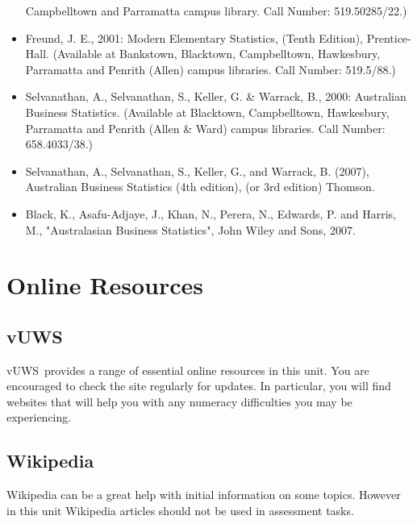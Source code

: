 \documentclass[a4paper,oneside]{book}
\newcommand{\vuws}{vUWS}
\begin{document}
\begin{itemize}
  Campbelltown and Parramatta campus library. Call Number: 519.50285/22.)
\item   Freund, J. E., 2001: Modern Elementary Statistics, (Tenth Edition), Prentice-Hall.
  (Available at Bankstown, Blacktown, Campbelltown, Hawkesbury, Parramatta and Penrith
  (Allen) campus libraries. Call Number: 519.5/88.)
\item   Selvanathan, A., Selvanathan, S., Keller, G. \& Warrack, B., 2000: Australian Business
  Statistics.
  (Available at Blacktown, Campbelltown, Hawkesbury, Parramatta and Penrith (Allen \&
  Ward) campus libraries. Call Number: 658.4033/38.)
\item   Selvanathan, A., Selvanathan, S., Keller, G., and Warrack, B. (2007), Australian Business
  Statistics (4th edition), (or 3rd edition) Thomson.
\item   Black, K., Asafu-Adjaye, J., Khan, N., Perera, N., Edwards, P. and Harris, M.,
  "Australasian Business Statistics", John Wiley and Sons, 2007.
\end{itemize}






\section{Online Resources}

\subsection*{\vuws}

\vuws~provides a range of essential online resources in this unit.  You
are encouraged to check the site regularly for updates.  In
particular, you will find websites that will help you with any
numeracy difficulties you may be experiencing.

\subsection*{Wikipedia}

Wikipedia can be a great help with initial information on some topics.
However in this unit Wikipedia articles should not be used in
assessment tasks.
\end{document}
